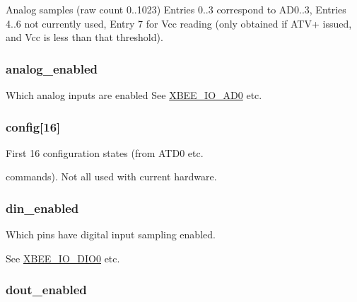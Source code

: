 Analog samples (raw count 0..1023) Entries 0..3 correspond to A\-D0..3, Entries 4..6 not currently used, Entry 7 for Vcc reading (only obtained if A\-T\-V+ issued, and Vcc is less than that threshold). 

\hypertarget{group__xbee__io_ga8473837f97f54ee29f09cd8f9c15e084}{
\subsubsection[{analog\-\_\-enabled}]{ analog\-\_\-enabled}}\label{group__xbee__io_ga8473837f97f54ee29f09cd8f9c15e084}


Which analog inputs are enabled See \hyperlink{group__xbee__io_gafc56816e62b0dd0a8d981b08f5f29651}{X\-B\-E\-E\-\_\-\-I\-O\-\_\-\-A\-D0} etc. 

\hypertarget{group__xbee__io_ga46d8dea1f8c2a731faf0db27d6ed308f}{
\subsubsection[{config}]{ config\mbox{[}16\mbox{]}}}\label{group__xbee__io_ga46d8dea1f8c2a731faf0db27d6ed308f}


First 16 configuration states (from A\-T\-D0 etc. 

commands). Not all used with current hardware. \hypertarget{group__xbee__io_gabf150485c21c63b46d511cb50b2bf2df}{
\subsubsection[{din\-\_\-enabled}]{ din\-\_\-enabled}}\label{group__xbee__io_gabf150485c21c63b46d511cb50b2bf2df}


Which pins have digital input sampling enabled. 

See \hyperlink{group__xbee__io_gaf01ab2d51afb8e360ade1ec5ceb15f0c}{X\-B\-E\-E\-\_\-\-I\-O\-\_\-\-D\-I\-O0} etc. \hypertarget{group__xbee__io_gab9c5cc4d30d476f26698c96f9aa329fe}{
\subsubsection[{dout\-\_\-enabled}]{ dout\-\_\-enabled}}\label{group__xbee__io_gab9c5cc4d30d476f26698c96f9aa329fe}



